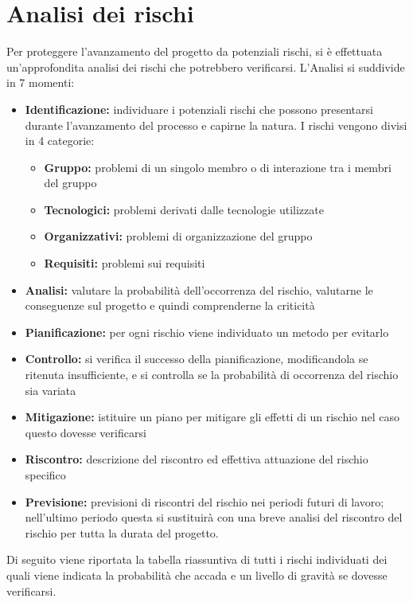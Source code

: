 \documentclass[12pt,a4paper]{article}
\begin{document}
\newpage

\section{Analisi dei rischi}\label{Analisi dei rischi}

Per proteggere l’avanzamento del progetto da potenziali rischi, si è effettuata un’approfondita analisi dei rischi che potrebbero verificarsi. L’Analisi si suddivide in 7 momenti:
\begin{itemize}
	\item \textbf{Identificazione:} individuare i potenziali rischi che possono presentarsi durante l’avanzamento del processo e capirne la natura. I rischi vengono divisi in 4 categorie:
	\begin{itemize}
		\item \textbf{Gruppo:} problemi di un singolo membro o di interazione tra i membri del gruppo
		\item \textbf{Tecnologici:} problemi derivati dalle tecnologie utilizzate
		\item \textbf{Organizzativi:} problemi di organizzazione del gruppo
		\item \textbf{Requisiti:} problemi sui requisiti
	\end{itemize}
	\item \textbf{Analisi:} valutare la probabilità dell’occorrenza del rischio, valutarne le conseguenze sul progetto e quindi comprenderne la criticità
	\item \textbf{Pianificazione:} per ogni rischio viene individuato un metodo per evitarlo
	\item \textbf{Controllo:} si verifica il successo della pianificazione, modificandola se ritenuta insufficiente, e si controlla se la probabilità di occorrenza del rischio sia variata
	\item \textbf{Mitigazione:} istituire un piano per mitigare gli effetti di un rischio nel caso questo dovesse verificarsi
	\item \textbf{Riscontro:} descrizione del riscontro ed effettiva attuazione del rischio specifico
	\item \textbf{Previsione:} previsioni di riscontri del rischio nei periodi futuri di lavoro; nell'ultimo periodo questa si sustituirà con una breve analisi del riscontro del rischio per tutta la durata del progetto.
\end{itemize}
Di seguito viene riportata la tabella riassuntiva di tutti i rischi individuati dei quali viene indicata la probabilità che accada e un livello di gravità se dovesse verificarsi.
\end{document}
